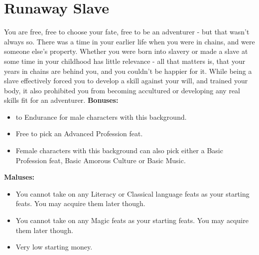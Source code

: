 \section{Runaway Slave}
You are free, free to choose your fate, free to be an adventurer - but that wasn't always so. There was a time in your earlier life when you were in chains, and were someone else's property. Whether you were born into slavery or made a slave at some time in your childhood has little relevance - all that matters is, that your years in chains are behind you, and you couldn't be happier for it. While being a slave effectively forced you to develop a skill against your will, and trained your body, it also prohibited you from becoming accultured or developing any real skills fit for an adventurer.\newline
\textbf{Bonuses:}
\begin{itemize}
	\item {} to Endurance for male characters with this background.
	\item Free to pick an Advanced Profession feat.
	\item Female characters with this background can also pick either a Basic Profession feat, Basic Amorous Culture or Basic Music.
\end{itemize}
\textbf{Maluses:}
\begin{itemize}
	\item You cannot take on any Literacy or Classical language feats as your starting feats. You may acquire them later though.
	\item You cannot take on any Magic feats as your starting feats. You may acquire them later though.
	\item Very low starting money.
\end{itemize}
